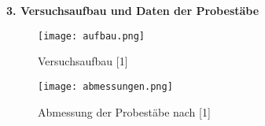 \documentclass{scrartcl}
\begin{document}
\textbf{\Large{3. Versuchsaufbau und Daten der Probestäbe}}
\newline
\newline
\begin{figure}
  \centering
  \texttt{[image: aufbau.png]}
  \caption{Versuchsaufbau [1]}
  \label{fig:bild1}
\end{figure}

 \newline


 \newline




\begin{figure}
  \centering
  \texttt{[image: abmessungen.png]}
  \caption{Abmessung der Probestäbe nach [1]}
  \label{fig:bild1}
\end{figure}
\end{document}
